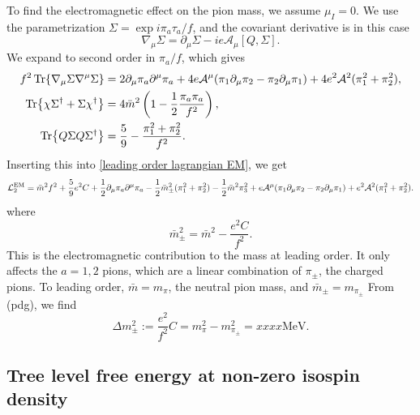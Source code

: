 To find the electromagnetic effect on the pion mass, we assume $\mu_I = 0$.
We use the parametrization $\Sigma = \exp{i \pi_a \tau_a / f}$, and the covariant derivative is in this case
%
\begin{equation}
    \nabla_\mu \Sigma = \partial_\mu \Sigma - i e \mathcal A_\mu [Q, \Sigma].
\end{equation}
%
We expand to second order in $\pi_a/f$, which gives
%
\begin{align}
    f^2 \Tr{\nabla_\mu \Sigma \nabla^\mu \Sigma}
    &=
    2\partial_\mu \pi_a\partial^\mu \pi_a
    + 4 e \mathcal A^\mu (\pi_1 \partial_\mu \pi_2 -\pi_2 \partial_\mu \pi_1)
    + 4 e^2 \mathcal A^2 (\pi_1^2 + \pi_2^2), \\
    \Tr{\chi \Sigma^\dagger + \Sigma \chi^\dagger}
    & = 4 \bar m^2\left(1 - \frac{1}{2} \frac{\pi_a \pi_a}{f^2}\right), \\
    \Tr{Q \Sigma Q \Sigma^\dagger}
    & = \frac{5}{9} - \frac{\pi_1^2 + \pi_2^2}{f^2}.
\end{align}
%
Inserting this into \autoref{leading order lagrangian EM}, we get
%
\begin{equation}
    \mathcal{L}_2^\text{EM}
    = \bar m^2 f^2 + \frac{5}{9}e^2 C
    + \frac{1}{2}\partial_\mu \pi_a \partial^\mu \pi_a
    - \frac{1}{2} \bar m_\pm^2 (\pi_1^2 + \pi_2^2) 
    - \frac{1}{2}\bar m^2 \pi_3^2
    + e \mathcal A^\mu (\pi_1 \partial_\mu \pi_2 -\pi_2 \partial_\mu \pi_1)
    + e^2 \mathcal A^2 (\pi_1^2 + \pi_2^2).
\end{equation}
%
where
\begin{equation}
    \bar m_\pm^2 = \bar m^2 - \frac{e^2 C}{f^2}.
\end{equation}
%
This is the electromagnetic contribution to the mass at leading order.
It only affects the $a = 1, 2$ pions, which are a linear combination of $\pi_\pm$, the charged pions.
To leading order, $\bar m = m_\pi$, the neutral pion mass, and $\bar m_{\pm} = m_{\pi_{\pm}}$
From (pdg), we find
%
\begin{equation}
    \Delta m_{\pm}^2 := \frac{e^2}{f^2}C = m_{\pi}^2 - m_{\pi_\pm}^2 = xxxx \text{MeV}.
\end{equation}
%


\subsection{Tree level free energy at non-zero isospin density} 

